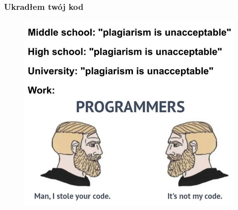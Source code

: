 \documentclass[10pt,t]{beamer}
\begin{document}
\begin{frame}
  \frametitle{Ukradłem twój kod}


  \begin{figure}

    \centering


    \includegraphics[scale=0.33]
    {./PresentationsPictures/I-stole-your-code.png}

  \end{figure}

\end{frame}
\end{document}
